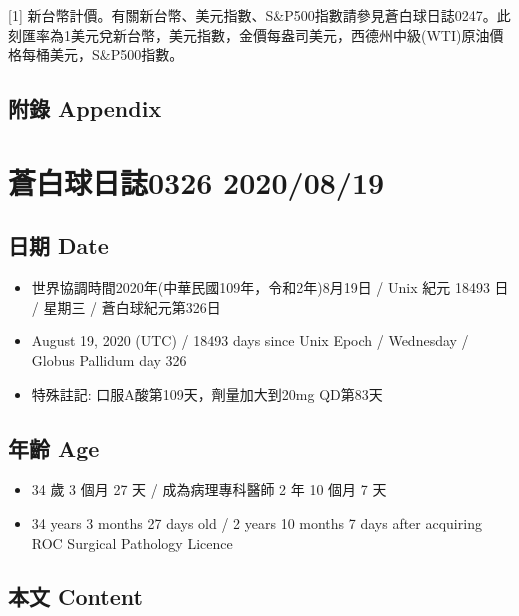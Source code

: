 \documentclass[a5paper, 11pt
]{book}
\providecommand{\tightlist}{%
  \setlength{\itemsep}{0pt}\setlength{\parskip}{0pt}}
\begin{document}
{[}1{]}
新台幣計價。有關新台幣、美元指數、S\&P500指數請參見蒼白球日誌0247。此刻匯率為1美元兌新台幣，美元指數，金價每盎司美元，西德州中級(WTI)原油價格每桶美元，S\&P500指數。

\hypertarget{ux9644ux9304-appendix-78}{%
\subsection{附錄 Appendix}\label{ux9644ux9304-appendix-78}}

\hypertarget{ux84bcux767dux7403ux65e5ux8a8c0326-20200819}{%
\section{蒼白球日誌0326
2020/08/19}\label{ux84bcux767dux7403ux65e5ux8a8c0326-20200819}}

\hypertarget{ux65e5ux671f-date-79}{%
\subsection{日期 Date}\label{ux65e5ux671f-date-79}}

\begin{itemize}
\tightlist
\item
  世界協調時間2020年(中華民國109年，令和2年)8月19日 / Unix 紀元 18493 日
  / 星期三 / 蒼白球紀元第326日
\item
  August 19, 2020 (UTC) / 18493 days since Unix Epoch / Wednesday /
  Globus Pallidum day 326
\item
  特殊註記: 口服A酸第109天，劑量加大到20mg QD第83天
\end{itemize}

\hypertarget{ux5e74ux9f61-age-79}{%
\subsection{年齡 Age}\label{ux5e74ux9f61-age-79}}

\begin{itemize}
\tightlist
\item
  34 歲 3 個月 27 天 / 成為病理專科醫師 2 年 10 個月 7 天
\item
  34 years 3 months 27 days old / 2 years 10 months 7 days after
  acquiring ROC Surgical Pathology Licence
\end{itemize}

\hypertarget{ux672cux6587-content-79}{%
\subsection{本文 Content}\label{ux672cux6587-content-79}}
\end{document}
